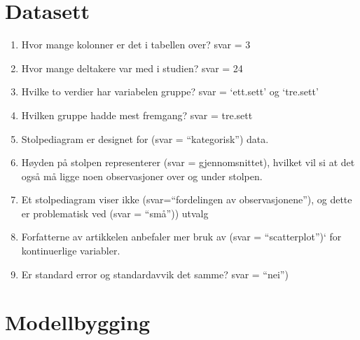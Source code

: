 \documentclass[
]{book}
\providecommand{\tightlist}{%
  \setlength{\itemsep}{0pt}\setlength{\parskip}{0pt}}
\begin{document}
\hypertarget{datasett-2}{%
\section{Datasett}\label{datasett-2}}

\begin{enumerate}
\def\labelenumi{\alph{enumi}.}
\tightlist
\item
  Hvor mange kolonner er det i tabellen over? svar = 3
\item
  Hvor mange deltakere var med i studien? svar = 24
\item
  Hvilke to verdier har variabelen gruppe? svar = `ett.sett' og `tre.sett'
\item
  Hvilken gruppe hadde mest fremgang? svar = tre.sett
\item
  Stolpediagram er designet for (svar = ``kategorisk'') data.
\item
  Høyden på stolpen representerer (svar = gjennomsnittet), hvilket vil si at det også må ligge noen observasjoner over og under stolpen.
\item
  Et stolpediagram viser ikke (svar=``fordelingen av observasjonene''), og dette er problematisk ved (svar = ``små'')) utvalg
\item
  Forfatterne av artikkelen anbefaler mer bruk av (svar = ``scatterplot'')` for kontinuerlige variabler.
\item
  Er standard error og standardavvik det samme? svar = ``nei'')
\end{enumerate}

\hypertarget{modellbygging}{%
\section{Modellbygging}\label{modellbygging}}
\end{document}
